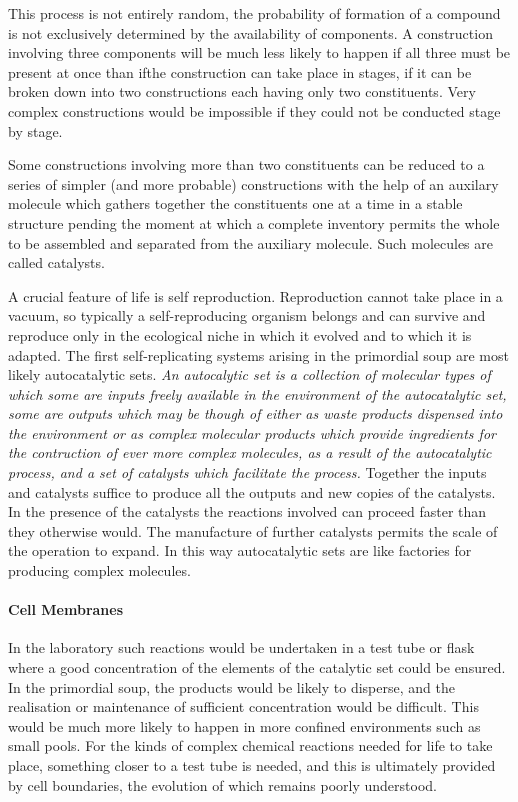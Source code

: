 \documentclass[10pt,titlepage]{book}
\begin{document}
    This process is not entirely random, the probability of formation of a compound is not exclusively determined by the availability of components.
    A construction involving three components will be much less likely to happen if all three must be present at once than ifthe construction can take place in stages, if it can be broken down into two constructions each having only two constituents.
    Very complex constructions would be impossible if they could not be conducted stage by stage.

    Some constructions involving more than two constituents can be reduced to a series of simpler (and more probable) constructions with the help of an auxilary molecule which gathers together the constituents one at a time in a stable structure pending the moment at which a complete inventory permits the whole to be assembled and separated from the auxiliary molecule.
    Such molecules are called catalysts.

    A crucial feature of life is self reproduction.
    Reproduction cannot take place in a vacuum, so typically a self-reproducing organism belongs and can survive and reproduce only in the ecological niche in which it evolved and to which it is adapted.
    The first self-replicating systems arising in the primordial soup are most likely autocatalytic sets.
   \emph{ An autocalytic set is a collection of molecular types of which some are inputs freely available in the environment of the autocatalytic set, some are outputs which may be though of either as waste products dispensed into the environment or as complex molecular products which provide ingredients for the contruction of ever more complex molecules, as a result of the autocatalytic process, and a set of catalysts which facilitate the process.}
    Together the inputs and catalysts suffice to produce all the outputs and new copies of the catalysts.
    In the presence of the catalysts the reactions involved can proceed faster than they otherwise would.
    The manufacture of further catalysts permits the scale of the operation to expand.
    In this way autocatalytic sets are like factories for producing complex molecules.

\paragraph{Cell Membranes}
    In the laboratory such reactions would be undertaken in a test tube or flask where a good concentration of the elements of the catalytic set could be ensured.
    In the primordial soup, the products would be likely to disperse, and the realisation or maintenance of sufficient concentration would be difficult.
    This would be much more likely to happen in more confined environments such as small pools.
    For the kinds of complex chemical reactions needed for life to take place, something closer to a test tube is needed, and this is ultimately provided by cell boundaries, the evolution of which remains poorly understood.
\end{document}
